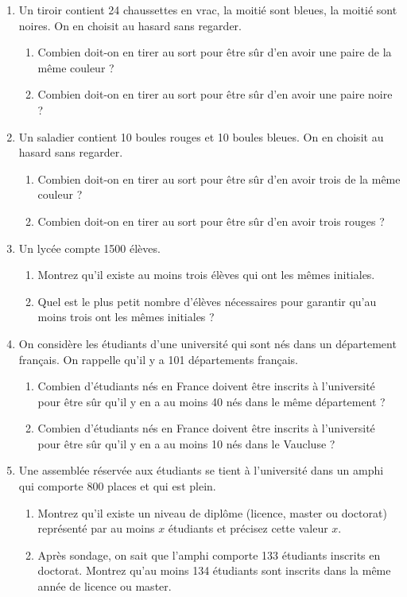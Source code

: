 \documentclass[a4paper,11pt]{article}
\begin{document}
\begin{enumerate}
\item Un tiroir contient 24 chaussettes en vrac, la moitié sont bleues, la moitié sont noires. On en choisit au hasard sans regarder.
\begin{enumerate}
\item Combien doit-on en tirer au sort pour être sûr d'en avoir une paire de la même couleur ?
\item Combien doit-on en tirer au sort pour être sûr d'en avoir une paire noire ?
\end{enumerate}

\item Un saladier contient 10 boules rouges et 10 boules bleues. On en choisit au hasard sans regarder.
\begin{enumerate}
\item Combien doit-on en tirer au sort pour être sûr d'en avoir trois de la même couleur ?
\item Combien doit-on en tirer au sort pour être sûr d'en avoir trois rouges ?
\end{enumerate}

\item Un lycée compte 1500 élèves.
\begin{enumerate}
\item Montrez qu'il existe au moins trois élèves qui ont les mêmes initiales.
\item Quel est le plus petit nombre d'élèves nécessaires pour garantir qu'au moins trois ont les mêmes initiales ?
\end{enumerate}

\item On considère les étudiants d'une université qui sont nés dans un département français. On rappelle qu'il y a 101 départements français.
\begin{enumerate}
\item Combien d'étudiants nés en France doivent être inscrits à l'université pour être sûr qu'il y en a au moins 40 nés dans le même département ?
\item Combien d'étudiants nés en France doivent être inscrits à l'université pour être sûr qu'il y en a au moins 10 nés dans le Vaucluse ?
\end{enumerate}

\item Une assemblée réservée aux étudiants se tient à l'université dans un amphi qui comporte 800 places et qui est plein.
\begin{enumerate}
\item Montrez qu'il existe un niveau de diplôme (licence, master ou doctorat) représenté par au moins $x$ étudiants et précisez cette valeur $x$.
\item Après sondage, on sait que l'amphi comporte 133 étudiants inscrits en doctorat. Montrez qu'au moins 134 étudiants sont inscrits dans la même année de licence ou master.
\end{enumerate}
\end{enumerate}
\end{document}
